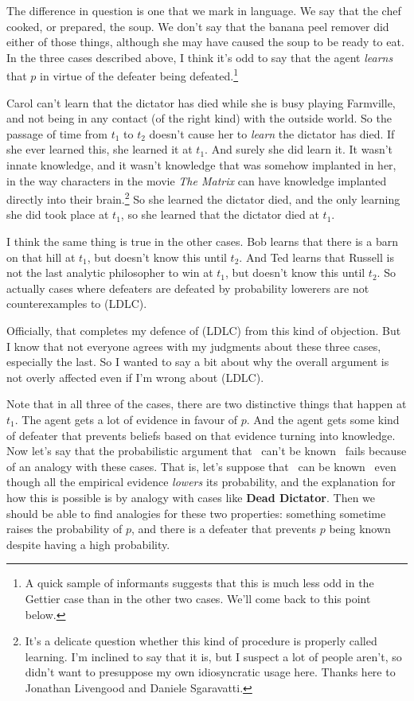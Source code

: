 The difference in question is one that we mark in language. We say that the chef cooked, or prepared, the soup. We don't say that the banana peel remover did either of those things, although she may have caused the soup to be ready to eat. In the three cases described above, I think it's odd to say that the agent \textit{learns} that $p$ in virtue of the defeater being defeated.\footnote{A quick sample of informants suggests that this is much less odd in the Gettier case than in the other two cases. We'll come back to this point below.} 

Carol can't learn that the dictator has died while she is busy playing Farmville, and not being in any contact (of the right kind) with the outside world. So the passage of time from $t_1$ to $t_2$ doesn't cause her to \textit{learn} the dictator has died. If she ever learned this, she learned it at $t_1$. And surely she did learn it. It wasn't innate knowledge, and it wasn't knowledge that was somehow implanted in her, in the way characters in the movie \textit{The Matrix} can have knowledge implanted directly into their brain.\footnote{It's a delicate question whether this kind of procedure is properly called learning. I'm inclined to say that it is, but I suspect a lot of people aren't, so didn't want to presuppose my own idiosyncratic usage here. Thanks here to Jonathan Livengood and Daniele Sgaravatti.} So she learned the dictator died, and the only learning she did took place at $t_1$, so she learned that the dictator died at $t_1$.

I think the same thing is true in the other cases. Bob learns that there is a barn on that hill at $t_1$, but doesn't know this until $t_2$. And Ted learns that Russell is not the last analytic philosopher to win at $t_1$, but doesn't know this until $t_2$. So actually cases where defeaters are defeated by probability lowerers are not counterexamples to (LDLC). 

Officially, that completes my defence of (LDLC) from this kind of objection. But I know that not everyone agrees with my judgments about these three cases, especially the last. So I wanted to say a bit about why the overall argument is not overly affected even if I'm wrong about (LDLC).

Note that in all three of the cases, there are two distinctive things that happen at $t_1$. The agent gets a lot of evidence in favour of $p$. And the agent gets some kind of defeater that prevents beliefs based on that evidence turning into knowledge. Now let's say that the probabilistic argument that \ECH\ can't be known \apo\ fails because of an analogy with these cases. That is, let's suppose that \ECH\ can be known \apo\ even though all the empirical evidence \textit{lowers} its probability, and the explanation for how this is possible is by analogy with cases like \textbf{Dead Dictator}. Then we should be able to find analogies for these two properties: something sometime raises the probability of $p$, and there is a defeater that prevents $p$ being known despite having a high probability.

